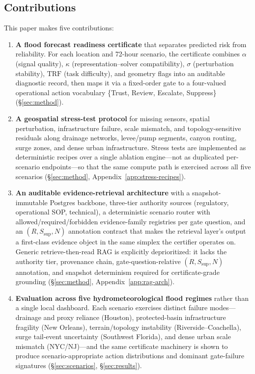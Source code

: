 \documentclass[sigconf,nonacm=true,review,authoryear]{acmart}
\begin{document}
\subsection{Contributions}
\label{sec:intro-contributions}

This paper makes five contributions:

\begin{enumerate}
\item \textbf{A flood forecast readiness certificate} that separates predicted risk from reliability. For each location and 72-hour scenario, the certificate combines $\alpha$ (signal quality), $\kappa$ (representation--solver compatibility), $\sigma$ (perturbation stability), $\mathrm{TRF}$ (task difficulty), and geometry flags into an auditable diagnostic record, then maps it via a fixed-order gate to a four-valued operational action vocabulary \{Trust, Review, Escalate, Suppress\} (\S\ref{sec:method}).

\item \textbf{A geospatial stress-test protocol} for missing sensors, spatial perturbation, infrastructure failure, scale mismatch, and topology-sensitive residuals along drainage networks, levee/pump segments, canyon routing, surge zones, and dense urban infrastructure. Stress tests are implemented as deterministic recipes over a single ablation engine---not as duplicated per-scenario endpoints---so that the same compute path is exercised across all five scenarios (\S\ref{sec:method}, Appendix~\ref{app:stress-recipes}).

\item \textbf{An auditable evidence-retrieval architecture} with a snapshot-immutable Postgres backbone, three-tier authority sources (regulatory, operational SOP, technical), a deterministic scenario router with allowed/required/forbidden evidence-family registries per gate question, and an $(R, S_{\text{sup}}, N)$ annotation contract that makes the retrieval layer's output a first-class evidence object in the same simplex the certifier operates on. Generic retrieve-then-read RAG is explicitly deprioritized: it lacks the authority tier, provenance chain, gate-question-relative $(R, S_{\text{sup}}, N)$ annotation, and snapshot determinism required for certificate-grade grounding (\S\ref{sec:method}, Appendix~\ref{app:rag-arch}).

\item \textbf{Evaluation across five hydrometeorological flood regimes} rather than a single local dashboard. Each scenario exercises distinct failure modes---drainage and proxy reliance (Houston), protected-basin infrastructure fragility (New Orleans), terrain/topology instability (Riverside--Coachella), surge tail-event uncertainty (Southwest Florida), and dense urban scale mismatch (NYC/NJ)---and the same certificate machinery is shown to produce scenario-appropriate action distributions and dominant gate-failure signatures (\S\ref{sec:scenarios}, \S\ref{sec:results}).


\end{enumerate}
\end{document}
